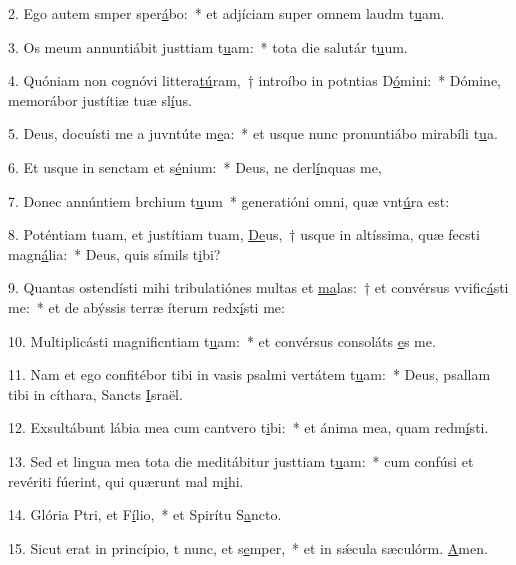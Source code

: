2. Ego autem smper sper\uline{á}bo:~* et adjíciam super omnem laudm t\uline{u}am.\par 
3. Os meum annuntiábit justtiam t\uline{u}am:~* tota die salutár t\uline{u}um.\par 
4. Quóniam non cognóvi littera\uline{tú}ram,~† introíbo in potntias D\uline{ó}mini:~* Dómine, memorábor justítiæ tuæ sl\uline{í}us.\par 
5. Deus, docuísti me a juvntúte m\uline{e}a:~* et usque nunc pronuntiábo mirabíli t\uline{u}a.\par 
6. Et usque in senctam et s\uline{é}nium:~* Deus, ne derl\uline{í}nquas me,\par 
7. Donec annúntiem brchium t\uline{u}um~* generatióni omni, quæ vnt\uline{ú}ra est:\par 
8. Poténtiam tuam, et justítiam tuam, \uline{De}us,~† usque in altíssima, quæ fecsti magn\uline{á}lia:~* Deus, quis símils t\uline{i}bi?\par 
9. Quantas ostendísti mihi tribulatiónes multas et \uline{ma}las:~† et convérsus vvific\uline{á}sti me:~* et de abýssis terræ íterum redx\uline{í}sti me:\par 
10. Multiplicásti magnificntiam t\uline{u}am:~* et convérsus consoláts \uline{e}s me.\par 
11. Nam et ego confitébor tibi in vasis psalmi vertátem t\uline{u}am:~* Deus, psallam tibi in cíthara, Sancts \uline{I}sraël.\par 
12. Exsultábunt lábia mea cum cantvero t\uline{i}bi:~* et ánima mea, quam redm\uline{í}sti.\par 
13. Sed et lingua mea tota die meditábitur justtiam t\uline{u}am:~* cum confúsi et revériti fúerint, qui quærunt mal m\uline{i}hi.\par 
14. Glória Ptri, et F\uline{í}lio,~* et Spirítu S\uline{a}ncto.\par 
15. Sicut erat in princípio, t nunc, et s\uline{e}mper,~* et in sǽcula sæculórm. \uline{A}men.\par 
